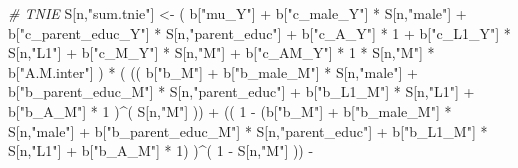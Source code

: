 \documentclass[
]{book}
\newenvironment{Shaded}{\begin{snugshade}}{\end{snugshade}}
\newcommand{\CommentTok}[1]{\textcolor[rgb]{0.56,0.35,0.01}{\textit{#1}}}
\newcommand{\DecValTok}[1]{\textcolor[rgb]{0.00,0.00,0.81}{#1}}
\newcommand{\NormalTok}[1]{#1}
\newcommand{\OtherTok}[1]{\textcolor[rgb]{0.56,0.35,0.01}{#1}}
\newcommand{\SpecialCharTok}[1]{\textcolor[rgb]{0.00,0.00,0.00}{#1}}
\newcommand{\StringTok}[1]{\textcolor[rgb]{0.31,0.60,0.02}{#1}}
\begin{document}
\begin{Shaded}
\begin{Highlighting}[]
    \CommentTok{\# TNIE }
\NormalTok{    S[n,}\StringTok{"sum.tnie"}\NormalTok{] }\OtherTok{\textless{}{-}}\NormalTok{ ( b[}\StringTok{"mu\_Y"}\NormalTok{] }\SpecialCharTok{+} 
\NormalTok{                           b[}\StringTok{"c\_male\_Y"}\NormalTok{] }\SpecialCharTok{*}\NormalTok{ S[n,}\StringTok{"male"}\NormalTok{] }\SpecialCharTok{+} 
\NormalTok{                           b[}\StringTok{"c\_parent\_educ\_Y"}\NormalTok{] }\SpecialCharTok{*}\NormalTok{ S[n,}\StringTok{"parent\_educ"}\NormalTok{] }\SpecialCharTok{+} 
\NormalTok{                           b[}\StringTok{"c\_A\_Y"}\NormalTok{] }\SpecialCharTok{*} \DecValTok{1} \SpecialCharTok{+} 
\NormalTok{                           b[}\StringTok{"c\_L1\_Y"}\NormalTok{] }\SpecialCharTok{*}\NormalTok{ S[n,}\StringTok{"L1"}\NormalTok{] }\SpecialCharTok{+}
\NormalTok{                           b[}\StringTok{"c\_M\_Y"}\NormalTok{] }\SpecialCharTok{*}\NormalTok{ S[n,}\StringTok{"M"}\NormalTok{] }\SpecialCharTok{+}
\NormalTok{                           b[}\StringTok{"c\_AM\_Y"}\NormalTok{] }\SpecialCharTok{*} \DecValTok{1} \SpecialCharTok{*}\NormalTok{ S[n,}\StringTok{"M"}\NormalTok{] }\SpecialCharTok{*}\NormalTok{ b[}\StringTok{"A.M.inter"}\NormalTok{] ) }\SpecialCharTok{*}
\NormalTok{      ( (( b[}\StringTok{"b\_M"}\NormalTok{] }\SpecialCharTok{+} 
\NormalTok{             b[}\StringTok{"b\_male\_M"}\NormalTok{] }\SpecialCharTok{*}\NormalTok{ S[n,}\StringTok{"male"}\NormalTok{] }\SpecialCharTok{+} 
\NormalTok{             b[}\StringTok{"b\_parent\_educ\_M"}\NormalTok{] }\SpecialCharTok{*}\NormalTok{ S[n,}\StringTok{"parent\_educ"}\NormalTok{] }\SpecialCharTok{+} 
\NormalTok{             b[}\StringTok{"b\_L1\_M"}\NormalTok{] }\SpecialCharTok{*}\NormalTok{ S[n,}\StringTok{"L1"}\NormalTok{] }\SpecialCharTok{+}
\NormalTok{             b[}\StringTok{"b\_A\_M"}\NormalTok{] }\SpecialCharTok{*} \DecValTok{1}\NormalTok{ )}\SpecialCharTok{\^{}}\NormalTok{( S[n,}\StringTok{"M"}\NormalTok{] )) }\SpecialCharTok{+}
\NormalTok{          (( }\DecValTok{1} \SpecialCharTok{{-}}\NormalTok{ (b[}\StringTok{"b\_M"}\NormalTok{] }\SpecialCharTok{+} 
\NormalTok{                    b[}\StringTok{"b\_male\_M"}\NormalTok{] }\SpecialCharTok{*}\NormalTok{ S[n,}\StringTok{"male"}\NormalTok{] }\SpecialCharTok{+} 
\NormalTok{                    b[}\StringTok{"b\_parent\_educ\_M"}\NormalTok{] }\SpecialCharTok{*}\NormalTok{ S[n,}\StringTok{"parent\_educ"}\NormalTok{] }\SpecialCharTok{+} 
\NormalTok{                    b[}\StringTok{"b\_L1\_M"}\NormalTok{] }\SpecialCharTok{*}\NormalTok{ S[n,}\StringTok{"L1"}\NormalTok{] }\SpecialCharTok{+}
\NormalTok{                    b[}\StringTok{"b\_A\_M"}\NormalTok{] }\SpecialCharTok{*} \DecValTok{1}\NormalTok{) )}\SpecialCharTok{\^{}}\NormalTok{( }\DecValTok{1} \SpecialCharTok{{-}}\NormalTok{ S[n,}\StringTok{"M"}\NormalTok{] )) }\SpecialCharTok{{-}}

\end{Highlighting}
\end{Shaded}
\end{document}
